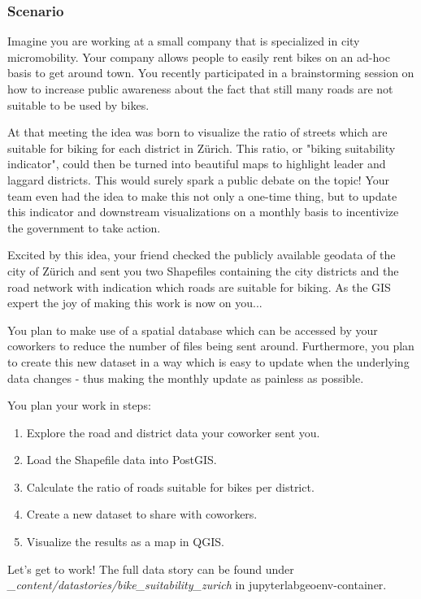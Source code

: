 \documentclass[11pt, a4paper, oneside, parskip=full-]{scrartcl}
\begin{document}
\subsubsection*{Scenario}

Imagine you are working at a small company that is specialized in city
micromobility. Your company allows people to easily rent bikes on an ad-hoc
basis to get around town. You recently participated in a brainstorming session
on how to increase public awareness about the fact that still many roads are not
suitable to be used by bikes.

At that meeting the idea was born to visualize the ratio of streets which are
suitable for biking for each district in Zürich. This ratio, or "biking
suitability indicator", could then be turned into beautiful maps to highlight
leader and laggard districts. This would surely spark a public debate on the
topic! Your team even had the idea to make this not only a one-time thing, but
to update this indicator and downstream visualizations on a monthly basis to
incentivize the government to take action.

Excited by this idea, your friend checked the publicly available geodata of the
city of Zürich and sent you two Shapefiles containing the city districts and the
road network with indication which roads are suitable for biking. As the GIS
expert the joy of making this work is now on you...

You plan to make use of a spatial database which can be accessed by your
coworkers to reduce the number of files being sent around. Furthermore, you plan
to create this new dataset in a way which is easy to update when the underlying
data changes - thus making the monthly update as painless as possible.

You plan your work in steps:
\begin{enumerate}
  \item Explore the road and district data your coworker sent you.
  \item Load the Shapefile data into PostGIS.
  \item Calculate the ratio of roads suitable for bikes per district.
  \item Create a new dataset to share with coworkers.
  \item Visualize the results as a map in QGIS.
\end{enumerate}

Let's get to work! The full data story can be found under
\emph{\_content/datastories/bike\_suitability\_zurich} in
jupyterlabgeoenv-container.
\end{document}
